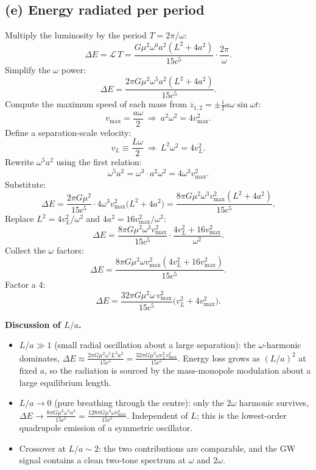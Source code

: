 \documentclass[11pt]{article}
\begin{document}
\subsection*{(e) Energy radiated per period}

Multiply the luminosity by the period $T=2\pi/\omega$:
\[
\Delta E=\mathcal L\,T=\frac{G\mu^2\omega^6 a^2(L^2+4a^2)}{15c^5}\cdot\frac{2\pi}{\omega}.
\]
Simplify the $\omega$ power:
\[
\Delta E=\frac{2\pi G\mu^2\omega^5 a^2(L^2+4a^2)}{15c^5}.
\]
Compute the maximum speed of each mass from $\dot z_{1,2}=\pm\tfrac12 a\omega\sin\omega t$:
\[
v_{\max}=\frac{a\omega}{2}\ \Longrightarrow\ a^2\omega^2=4v_{\max}^2.
\]
Define a separation-scale velocity:
\[
v_L\equiv\frac{L\omega}{2}\ \Longrightarrow\ L^2\omega^2=4v_L^2.
\]
Rewrite $\omega^5 a^2$ using the first relation:
\[
\omega^5 a^2=\omega^3\cdot a^2\omega^2=4\omega^3 v_{\max}^2.
\]
Substitute:
\[
\Delta E=\frac{2\pi G\mu^2}{15c^5}\cdot 4\omega^3 v_{\max}^2\bigl(L^2+4a^2\bigr)=\frac{8\pi G\mu^2\omega^3 v_{\max}^2(L^2+4a^2)}{15c^5}.
\]
Replace $L^2=4v_L^2/\omega^2$ and $4a^2=16v_{\max}^2/\omega^2$:
\[
\Delta E=\frac{8\pi G\mu^2\omega^3 v_{\max}^2}{15c^5}\cdot\frac{4v_L^2+16v_{\max}^2}{\omega^2}.
\]
Collect the $\omega$ factors:
\[
\Delta E=\frac{8\pi G\mu^2\omega v_{\max}^2(4v_L^2+16v_{\max}^2)}{15c^5}.
\]
Factor a 4:
\begin{equation}
\boxed{\ \Delta E=\frac{32\pi G\mu^2\omega\,v_{\max}^2}{15c^5}\bigl(v_L^2+4v_{\max}^2\bigr).\ }
\label{eq:DeltaEbox}
\end{equation}

\textbf{Discussion of $L/a$.}
\begin{itemize}
\item $L/a\gg 1$ (small radial oscillation about a large separation): the $\omega$-harmonic dominates, $\Delta E\approx\frac{2\pi G\mu^2\omega^5 L^2 a^2}{15c^5}=\frac{32\pi G\mu^2\omega v_L^2 v_{\max}^2}{15c^5}$. Energy loss grows as $(L/a)^2$ at fixed $a$, so the radiation is sourced by the mass-monopole modulation about a large equilibrium length.
\item $L/a\to 0$ (pure breathing through the centre): only the $2\omega$ harmonic survives, $\Delta E\to\frac{8\pi G\mu^2\omega^5 a^4}{15c^5}=\frac{128\pi G\mu^2\omega v_{\max}^4}{15c^5}$. Independent of $L$; this is the lowest-order quadrupole emission of a symmetric oscillator.
\item Crossover at $L/a\sim 2$: the two contributions are comparable, and the GW signal contains a clean two-tone spectrum at $\omega$ and $2\omega$.
\end{itemize}
\end{document}
